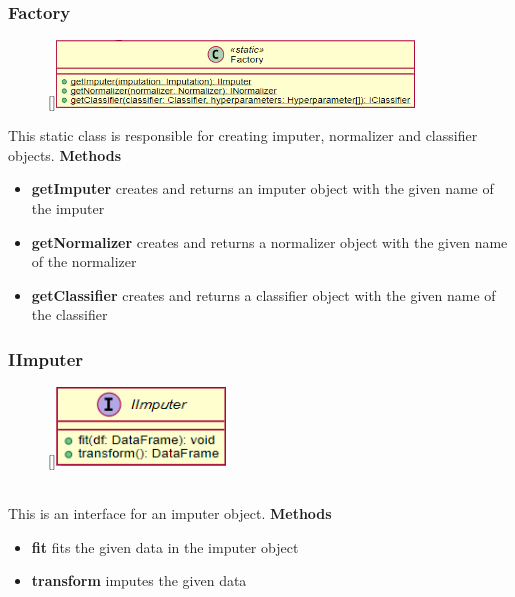 \subsubsection{Factory}
\label{Factory}
\begin{figure}
    \raisebox{0pt}[\dimexpr{}\baselineskip\relax]{\includegraphics[width=9.5cm]{classes/model-management/8.png}}
\end{figure} 
This static class is responsible for creating imputer, normalizer and classifier objects.
\newline
\newline
\textbf{Methods}
\begin{itemize}
    \item \textbf{getImputer} creates and returns an imputer object with the given name of the imputer
    \item \textbf{getNormalizer} creates and returns a normalizer object with the given name of the normalizer
    \item \textbf{getClassifier} creates and returns a classifier object with the given name of the classifier
\end{itemize}

\subsubsection{IImputer}
\label{IImputer}
\begin{figure}
    \raisebox{0pt}[\dimexpr{}\baselineskip\relax]{\includegraphics[width=4.5cm]{classes/model-management/9.png}}
\end{figure} 
~\\
This is an interface for an imputer object.
\newline
\newline
\newline
\newline
\newline
\textbf{Methods}
\begin{itemize}
    \item \textbf{fit} fits the given data in the imputer object
    \item \textbf{transform} imputes the given data
\end{itemize}

